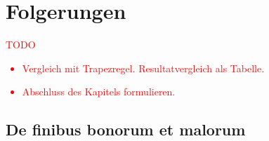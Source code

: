 %
%
%
\section{Folgerungen
\label{quadratur:section:folgerungen}}

\textcolor{red}{
    TODO
    \begin{itemize}
        \item Vergleich mit Trapezregel. Resultatvergleich als Tabelle.
        \item Abschluss des Kapitels formulieren.
    \end{itemize}
}

\subsection{De finibus bonorum et malorum
\label{quadratur:subsection:malorum}}



